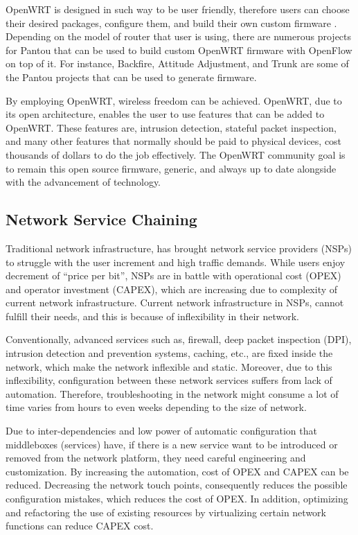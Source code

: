 \documentclass[english]{tktltiki2}
\theoremstyle{definition}
\theoremstyle{remark}
\begin{document}
{OpenWRT is designed in such way to be user friendly, therefore users can choose their desired packages, configure them, and build their own custom firmware \cite{Lor14}. Depending on the model of router that user is using, there are numerous projects for Pantou that can be used to build custom OpenWRT firmware with OpenFlow on top of it. For instance, Backfire, Attitude Adjustment, and Trunk are some of the Pantou projects that can be used to generate firmware. \cite{Sve14}

By employing OpenWRT, wireless freedom can be achieved. OpenWRT, due to its open architecture, enables the user to use features that can be added to OpenWRT. These features are, intrusion detection, stateful packet inspection, and many other features that normally should be paid to physical devices, cost thousands of dollars to do the job effectively. The OpenWRT community goal is to remain this open source firmware, generic, and always up to date alongside with the advancement of technology. \cite{Lor14}

\subsection{Network Service Chaining}

Traditional network infrastructure, has brought network service providers (NSPs) to struggle with the user increment and high traffic demands. While users enjoy decrement of “price per bit”, NSPs are in battle with operational cost (OPEX) and operator investment (CAPEX), which are increasing due to complexity of current network infrastructure. Current network infrastructure in NSPs, cannot fulfill their needs, and this is because of inflexibility in their network. \cite{Wol13}

Conventionally, advanced services such as, firewall, deep packet inspection (DPI), intrusion detection and prevention systems, caching, etc., are fixed inside the network, which make the network inflexible and static. Moreover, due to this inflexibility, configuration between these network services suffers from lack of automation. Therefore, troubleshooting in the network might consume a lot of time varies from hours to even weeks depending to the size of network. \cite{Wol13}

Due to inter-dependencies and low power of automatic configuration that middleboxes (services) have, if there is a new service want to be introduced or removed from the network platform, they need careful engineering and customization. By increasing the automation, cost of OPEX and CAPEX can be reduced.  Decreasing the network touch points, consequently reduces the possible configuration mistakes, which reduces the cost of OPEX. In addition, optimizing and refactoring the use of existing resources by virtualizing certain network functions can reduce CAPEX cost. \cite{Wol13}

}
\end{document}

